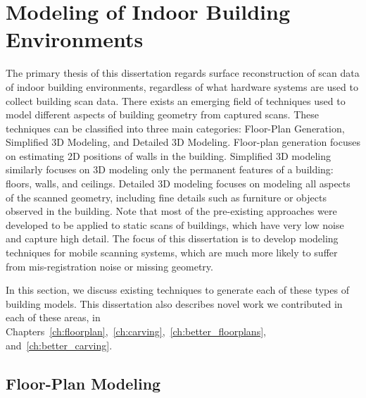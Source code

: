 \documentclass[12pt,onecolumn,oneside]{book}
\begin{document}
\section{Modeling of Indoor Building Environments}
\label{sec:building_meshing}

The primary thesis of this dissertation regards surface reconstruction of scan data of indoor building environments, regardless of what hardware systems are used to collect building scan data.  There exists an emerging field of techniques used to model different aspects of building geometry from captured scans.  These techniques can be classified into three main categories:  Floor-Plan Generation, Simplified 3D Modeling, and Detailed 3D Modeling.  Floor-plan generation focuses on estimating 2D positions of walls in the building.  Simplified 3D modeling similarly focuses on 3D modeling only the permanent features of a building: floors, walls, and ceilings.  Detailed 3D modeling focuses on modeling all aspects of the scanned geometry, including fine details such as furniture or objects observed in the building.  Note that most of the pre-existing approaches were developed to be applied to static scans of buildings, which have very low noise and capture high detail. The focus of this dissertation is to develop modeling techniques for mobile scanning systems, which are much more likely to suffer from mis-registration noise or missing geometry.

In this section, we discuss existing techniques to generate each of these types of building models.  This dissertation also describes novel work we contributed in each of these areas, in Chapters~\ref{ch:floorplan},~\ref{ch:carving},~\ref{ch:better_floorplans}, and~\ref{ch:better_carving}.

\subsection{Floor-Plan Modeling}
\label{ssec:background_floorplan}
\end{document}

